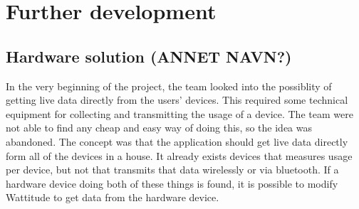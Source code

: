 \chapter{Further development}

\section{Hardware solution (ANNET NAVN?)}
In the very beginning of the project, the team looked into the possiblity of getting live data directly from the users' devices. This required some technical equipment for collecting and transmitting the usage of a device. The team were not able to find any cheap and easy way of doing this, so the idea was abandoned. The concept was that the application should get live data directly form all of the devices in a house. It already exists devices that measures usage per device, but not that transmits that data wirelessly or via bluetooth. If a hardware device doing both of these things is found, it is possible to modify Wattitude to get data from the hardware device. 